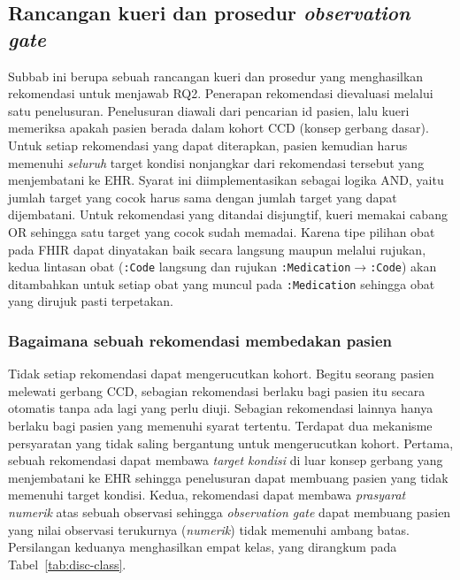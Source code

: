 \subsection{Rancangan kueri dan prosedur \emph{observation gate}}
Subbab ini berupa sebuah rancangan kueri dan prosedur yang menghasilkan rekomendasi untuk menjawab RQ2.
Penerapan rekomendasi dievaluasi melalui satu penelusuran. Penelusuran diawali dari
pencarian id pasien, lalu kueri memeriksa apakah pasien berada dalam kohort CCD (konsep
gerbang dasar). Untuk setiap rekomendasi yang dapat diterapkan, pasien kemudian harus
memenuhi \emph{seluruh} target kondisi nonjangkar dari rekomendasi tersebut yang
menjembatani ke EHR. Syarat ini diimplementasikan sebagai logika AND, yaitu jumlah target
yang cocok harus sama dengan jumlah target yang dapat dijembatani. Untuk rekomendasi yang ditandai disjungtif, kueri memakai cabang OR sehingga
satu target yang cocok sudah memadai. Karena tipe pilihan
obat pada FHIR dapat dinyatakan baik secara langsung maupun melalui rujukan, kedua lintasan
obat (\texttt{:Code} langsung dan rujukan
\texttt{:Medication}$\to$\texttt{:Code}) akan ditambahkan untuk setiap obat yang muncul pada \texttt{:Medication} sehingga
obat yang dirujuk pasti terpetakan.

\subsubsection*{Bagaimana sebuah rekomendasi membedakan pasien}
\label{sec:disc-class}
Tidak setiap rekomendasi dapat mengerucutkan kohort. Begitu seorang pasien melewati gerbang CCD,
sebagian rekomendasi berlaku bagi pasien itu secara otomatis tanpa ada lagi yang perlu diuji.
Sebagian rekomendasi lainnya hanya berlaku bagi pasien yang memenuhi syarat tertentu.
Terdapat dua mekanisme persyaratan yang tidak saling bergantung untuk mengerucutkan kohort. 
Pertama, sebuah rekomendasi dapat membawa \emph{target kondisi} di luar konsep gerbang
yang menjembatani ke EHR sehingga penelusuran dapat membuang pasien yang tidak
memenuhi target kondisi. Kedua, rekomendasi dapat membawa \emph{prasyarat numerik} atas sebuah
observasi sehingga \emph{observation gate} dapat membuang pasien yang nilai observasi terukurnya (\emph{numerik})
tidak memenuhi ambang batas. Persilangan keduanya menghasilkan empat kelas, yang dirangkum pada
Tabel~\ref{tab:disc-class}.

